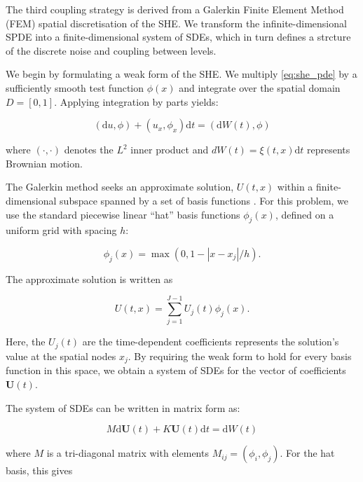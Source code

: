 The third coupling strategy is derived from a Galerkin Finite Element Method
(FEM) \cite{suli2025fe} spatial discretisation of the SHE. We transform 
the infinite-dimensional SPDE into a finite-dimensional system of SDEs, 
which in turn defines a strcture of the discrete noise and coupling between 
levels.

We begin by formulating a weak form of the SHE. We multiply \eqref{eq:she_pde} by 
a sufficiently smooth test function $\phi(x)$ and integrate over the spatial domain 
$D = [0,1]$. Applying integration by parts yields:

\begin{equation}\label{eq:she_differential_form}
    (\mathrm{d}u,\phi) + (u_x, \phi_x)\mathrm{d}t = (\mathrm{d}W(t), \phi)
\end{equation}

where $(\cdot, \cdot)$ denotes the $L^2$ inner product and  
$dW(t) = \xi(t,x)\mathrm{d}t$ represents Brownian
motion.

The Galerkin method seeks an approximate solution, $U(t,x)$ within a finite-dimensional
subspace spanned by a set of basis functions \cite{suli2025fe}. For this problem, 
we use the standard piecewise linear ``hat'' basis functions $\phi_j(x)$, defined on a 
uniform grid with spacing $h$:

\begin{equation*}
    \phi_j(x) = \max(0, 1 - |x-x_j|/ h).
\end{equation*}

The approximate solution is written as

\begin{equation*}
    U(t,x) = \sum_{j=1}^{J-1}U_j(t)\phi_j(x).
\end{equation*}

Here, the $U_j(t)$ are the time-dependent coefficients represents the solution's value at
the spatial nodes $x_j$. By requiring the weak form to hold for every basis function 
in this space, we obtain a system of SDEs for the vector of coefficients $\mathbf{U}(t)$. 

The system of SDEs can be written in matrix form as:

\begin{equation}\label{eq:fe_sdes_system}
    M \mathrm{d}\mathbf{U}(t) + K \mathbf{U}(t)\mathrm{d}t = \mathrm{d}W(t)
\end{equation}

where $M$ is a tri-diagonal matrix with elements $M_{ij} = (\phi_i, \phi_j)$. 
For the hat basis, this gives

